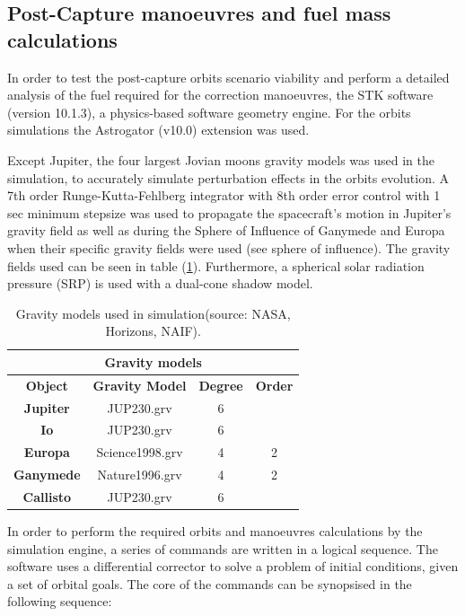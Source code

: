 \subsection{Post-Capture manoeuvres and fuel mass calculations}
In order to test the post-capture orbits scenario viability and perform a detailed analysis of the fuel required for the correction manoeuvres, the STK software (version 10.1.3), a physics-based software geometry engine. For the orbits simulations the Astrogator (v10.0) extension was used. 

Except Jupiter, the four largest Jovian moons gravity models was used in the simulation, to accurately simulate perturbation effects in the orbits evolution. A 7th order Runge-Kutta-Fehlberg integrator with 8th order error control with 1 sec minimum stepsize was used to propagate the spacecraft's motion in Jupiter's gravity field as well as during the Sphere of Influence of Ganymede and Europa when their specific gravity fields were used (see sphere of influence). The gravity fields used can be seen in table (\ref{tab:gravf}). Furthermore, a spherical solar radiation pressure (SRP) is used with a dual-cone shadow model.

\begin{table}[h!]
  \centering
    \begin{tabular}{|c|c|c|c|}
    \hline
    \multicolumn{4}{|c|}{\textbf{Gravity models}} \bigstrut\\
    \hline
    \textbf{Object} & \textbf{Gravity Model} & \textbf{Degree} & \textbf{Order} \bigstrut\\
    \hline
    \textbf{Jupiter} & JUP230.grv & 6     &  \bigstrut\\
    \hline
    \textbf{Io} & JUP230.grv & 6     &  \bigstrut\\
    \hline
    \textbf{Europa} & Science1998.grv & 4     & 2 \bigstrut\\
    \hline
    \textbf{Ganymede} & Nature1996.grv & 4     & 2 \bigstrut\\
    \hline
    \textbf{Callisto} & JUP230.grv & 6     &  \bigstrut\\
    \hline
    \end{tabular}%
    \caption{Gravity models used in simulation(source: NASA, Horizons, NAIF).\cite{Gravm}}\label{tab:gravf}
\end{table}%

In order to perform the required orbits and manoeuvres calculations by the simulation engine, a series of commands are written in a logical sequence. The software uses a differential corrector to solve a problem of initial conditions, given a set of orbital goals. 
The core of the commands can be synopsised in the following sequence:

